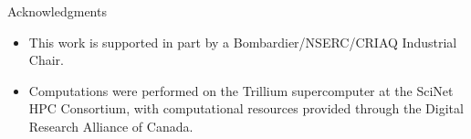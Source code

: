 \begin{frame}{Acknowledgments}

\begin{itemize}
    \item This work is supported in part by a Bombardier/NSERC/CRIAQ Industrial Chair.

    \item Computations were performed on the Trillium supercomputer at the SciNet HPC Consortium, with computational resources provided through the Digital Research Alliance of Canada.

\end{itemize}

\end{frame}
